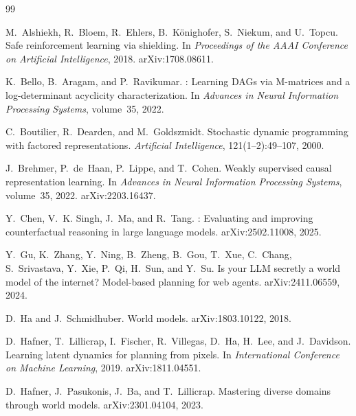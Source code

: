 \begin{thebibliography}{99}

M.~Alshiekh, R.~Bloem, R.~Ehlers, B.~K{\"o}nighofer, S.~Niekum, and U.~Topcu.
\newblock Safe reinforcement learning via shielding.
\newblock In \emph{Proceedings of the AAAI Conference on Artificial Intelligence}, 2018.
\newblock arXiv:1708.08611.

K.~Bello, B.~Aragam, and P.~Ravikumar.
: Learning {DAG}s via {M}-matrices and a log-determinant acyclicity characterization.
\newblock In \emph{Advances in Neural Information Processing Systems}, volume~35, 2022.

C.~Boutilier, R.~Dearden, and M.~Goldszmidt.
\newblock Stochastic dynamic programming with factored representations.
\newblock \emph{Artificial Intelligence}, 121(1--2):49--107, 2000.

J.~Brehmer, P.~de~Haan, P.~Lippe, and T.~Cohen.
\newblock Weakly supervised causal representation learning.
\newblock In \emph{Advances in Neural Information Processing Systems}, volume~35, 2022.
\newblock arXiv:2203.16437.

Y.~Chen, V.~K. Singh, J.~Ma, and R.~Tang.
: Evaluating and improving counterfactual reasoning in large language models.
\newblock arXiv:2502.11008, 2025.

Y.~Gu, K.~Zhang, Y.~Ning, B.~Zheng, B.~Gou, T.~Xue, C.~Chang, S.~Srivastava, Y.~Xie, P.~Qi, H.~Sun, and Y.~Su.
\newblock Is your {LLM} secretly a world model of the internet? {M}odel-based planning for web agents.
\newblock arXiv:2411.06559, 2024.

D.~Ha and J.~Schmidhuber.
\newblock World models.
\newblock arXiv:1803.10122, 2018.

D.~Hafner, T.~Lillicrap, I.~Fischer, R.~Villegas, D.~Ha, H.~Lee, and J.~Davidson.
\newblock Learning latent dynamics for planning from pixels.
\newblock In \emph{International Conference on Machine Learning}, 2019.
\newblock arXiv:1811.04551.

D.~Hafner, J.~Pasukonis, J.~Ba, and T.~Lillicrap.
\newblock Mastering diverse domains through world models.
\newblock arXiv:2301.04104, 2023.


\end{thebibliography}
